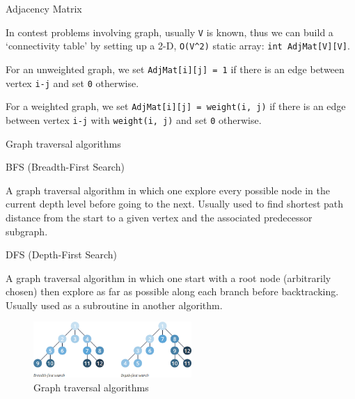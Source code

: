 \documentclass[ignorenonframetext,]{beamer}
\begin{document}
\begin{frame}[fragile]{Adjacency Matrix}
\protect\hypertarget{adjacency-matrix}{}

In contest problems involving graph, usually \texttt{V} is known, thus
we can build a `connectivity table' by setting up a 2-D,
\texttt{O(V\^{}2)} static array: \texttt{int\ AdjMat{[}V{]}{[}V{]}}.

For an unweighted graph, we set \texttt{AdjMat{[}i{]}{[}j{]}\ =\ 1} if
there is an edge between vertex \texttt{i-j} and set \texttt{0}
otherwise.

For a weighted graph, we set
\texttt{AdjMat{[}i{]}{[}j{]}\ =\ weight(i,\ j)} if there is an edge
between vertex \texttt{i-j} with \texttt{weight(i,\ j)} and set
\texttt{0} otherwise.

\end{frame}

\begin{frame}{Graph traversal algorithms}
\protect\hypertarget{graph-traversal-algorithms}{}

\begin{block}{BFS (Breadth-First Search)}

A graph traversal algorithm in which one explore every possible node in
the current depth level before going to the next. Usually used to find
shortest path distance from the start to a given vertex and the
associated predecessor subgraph.

\end{block}

\begin{block}{DFS (Depth-First Search)}

A graph traversal algorithm in which one start with a root node
(arbitrarily chosen) then explore as far as possible along each branch
before backtracking. Usually used as a subroutine in another algorithm.

\begin{figure}
\centering
\includegraphics[width=\textwidth,height=0.83333in]{graph-traversal-algorithms-1.png}
\caption{Graph traversal algorithms}
\end{figure}

\end{block}

\end{frame}
\end{document}
